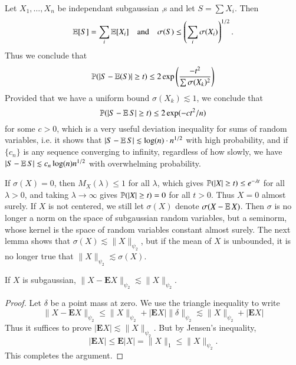 \begin{example}
    Let $X_1, \dots, X_n$ be independant subgaussian ,s and let $S = \sum X_i$. Then
    \[ \operatorname{\mathbb{E}}[S] = \sum_i \operatorname{\mathbb{E}}[X_i] \quad\text{and}\quad \sigma(S) \leq \left( \sum_i \sigma(X_i) \right)^{1/2}. \]
    Thus we conclude that
    \[ \mathbb{P}(|S - \operatorname{\mathbb{E}}(S)| \geq t) \leq 2 \exp \left( \frac{- t^2}{\sum \sigma(X_k)^2} \right) \]
    Provided that we have a uniform bound $\sigma(X_k) \lesssim 1$, we conclude that
    \[ \mathbb{P}(|S - \operatorname{\mathbb{E}} S| \geq t) \leq 2 \exp(-ct^2/n) \]
    for some $c > 0$, which is a very useful deviation inequality for sums of random variables, i.e. it shows that $|S - \operatorname{\mathbb{E}} S| \lesssim \log(n) \cdot n^{1/2}$ with high probability, and if $\{ c_n \}$ is any sequence converging to infinity, regardless of how slowly, we have $|S - \operatorname{\mathbb{E}} S| \lesssim c_n \log(n) n^{1/2}$ with overwhelming probability.
\end{example}

If $\sigma(X) = 0$, then $M_X(\lambda) \leq 1$ for all $\lambda$, which gives $\operatorname{\mathbb{P}}(|X| \geq t) \leq e^{-\lambda t}$ for all $\lambda > 0$, and taking $\lambda \to \infty$ gives $\operatorname{\mathbb{P}}(|X| \geq t) = 0$ for all $t > 0$. Thus $X = 0$ almost surely. If $X$ is not centered, we still let $\sigma(X)$ denote $\sigma(X - \operatorname{\mathbb{E}} X)$. Then $\sigma$ is no longer a norm on the space of subgaussian random variables, but a seminorm, whose kernel is the space of random variables constant almost surely. The next lemma shows that $\sigma(X) \lesssim \| X \|_{\psi_2}$, but if the mean of $X$ is unbounded, it is no longer true that $\| X \|_{\psi_2} \lesssim \sigma(X)$.

\begin{lemma}[Centering]
    If $X$ is subgaussian, $\| X - \mathbf{E} X \|_{\psi_2} \lesssim \| X \|_{\psi_2}$.
\end{lemma}
\begin{proof}
    Let $\delta$ be a point mass at zero. We use the triangle inequality to write
    \[ \| X - \mathbf{E }X \|_{\psi_2} \leq \| X \|_{\psi_2} + | \mathbf{E} X | \| \delta \|_{\psi_2} \lesssim \| X \|_{\psi_2} + | \mathbf{E} X | \]
    Thus it suffices to prove $|\mathbf{E} X | \lesssim \| X \|_{\psi_2}$. But by Jensen's inequality,
    \[ |\mathbf{E} X| \leq \mathbf{E} |X| = \| X \|_1 \leq \| X \|_{\psi_2}. \]
    This completes the argument.
\end{proof}

